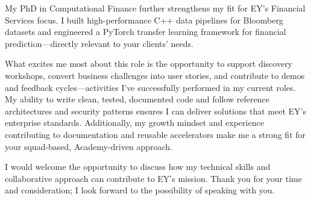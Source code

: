 \documentclass[10pt,a4paper,sans]{moderncv}
\begin{document}
My PhD in Computational Finance further strengthens my fit for EY’s Financial Services focus. I built high-performance C++ data pipelines for Bloomberg datasets and engineered a PyTorch transfer learning framework for financial prediction—directly relevant to your clients’ needs.

What excites me most about this role is the opportunity to support discovery workshops, convert business challenges into user stories, and contribute to demos and feedback cycles—activities I’ve successfully performed in my current roles. My ability to write clean, tested, documented code and follow reference architectures and security patterns ensures I can deliver solutions that meet EY’s enterprise standards. Additionally, my growth mindset and experience contributing to documentation and reusable accelerators make me a strong fit for your squad-based, Academy-driven approach.

I would welcome the opportunity to discuss how my technical skills and collaborative approach can contribute to EY’s mission. Thank you for your time and consideration; I look forward to the possibility of speaking with you.

\makeletterclosing
\end{document}
